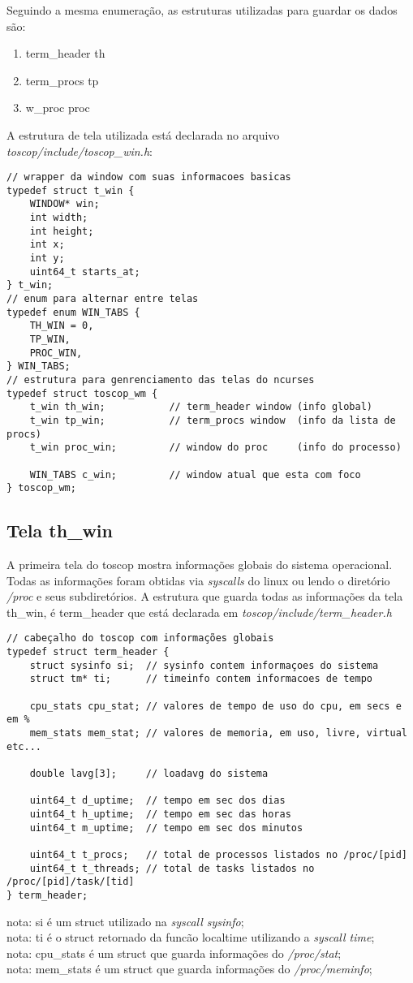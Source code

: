 \documentclass{article}
\begin{document}
Seguindo a mesma enumeração, as estruturas utilizadas para guardar os dados são:
\begin{enumerate}
    \item term\_header th 
    \item term\_procs tp
    \item w\_proc proc
\end{enumerate}

A estrutura de tela utilizada está declarada no arquivo 
\textit{toscop/include/toscop\_win.h}:
\begin{verbatim}
// wrapper da window com suas informacoes basicas
typedef struct t_win {
    WINDOW* win;
    int width;
    int height;
    int x;
    int y;
    uint64_t starts_at;
} t_win;
// enum para alternar entre telas
typedef enum WIN_TABS {
    TH_WIN = 0,
    TP_WIN,
    PROC_WIN,
} WIN_TABS;
// estrutura para genrenciamento das telas do ncurses
typedef struct toscop_wm {
    t_win th_win;           // term_header window (info global)
    t_win tp_win;           // term_procs window  (info da lista de procs)
    t_win proc_win;         // window do proc     (info do processo)

    WIN_TABS c_win;         // window atual que esta com foco
} toscop_wm;
\end{verbatim}

\subsection{Tela th\_win}
A primeira tela do toscop mostra informações globais do sistema 
operacional. Todas as informações foram obtidas via \textit{syscalls}
do linux ou lendo o diretório \textit{/proc} e seus subdiretórios. A 
estrutura que guarda todas as informações da tela th\_win, é term\_header
que está declarada em \textit{toscop/include/term\_header.h} 

\begin{verbatim}
// cabeçalho do toscop com informações globais
typedef struct term_header {
    struct sysinfo si;  // sysinfo contem informaçoes do sistema
    struct tm* ti;      // timeinfo contem informacoes de tempo

    cpu_stats cpu_stat; // valores de tempo de uso do cpu, em secs e em %
    mem_stats mem_stat; // valores de memoria, em uso, livre, virtual etc...

    double lavg[3];     // loadavg do sistema

    uint64_t d_uptime;  // tempo em sec dos dias
    uint64_t h_uptime;  // tempo em sec das horas
    uint64_t m_uptime;  // tempo em sec dos minutos

    uint64_t t_procs;   // total de processos listados no /proc/[pid]
    uint64_t t_threads; // total de tasks listados no /proc/[pid]/task/[tid]
} term_header;
\end{verbatim}
nota: si é um struct utilizado na \textit{syscall sysinfo};\\
nota: ti é o struct retornado da funcão localtime utilizando a \textit{syscall time};\\
nota: cpu\_stats é um struct que guarda informações do \textit{/proc/stat};\\
nota: mem\_stats é um struct que guarda informações do \textit{/proc/meminfo};
\end{document}

